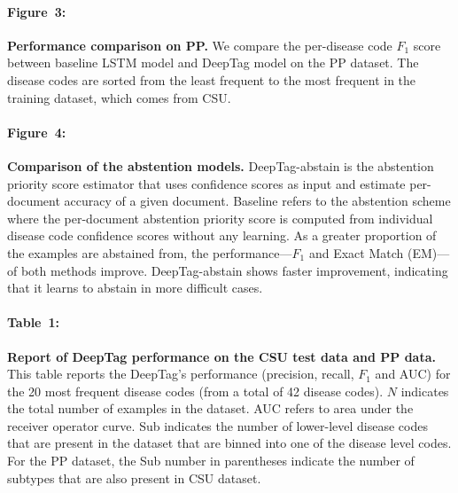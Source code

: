 \documentclass{article}[11pt,oneside]
\begin{document}
\paragraph{Figure~3:} {\bf Performance comparison on PP.} 
We compare the per-disease code $F_1$ score between baseline LSTM model and DeepTag model on the PP dataset. The disease codes are sorted from the least frequent to the most frequent in the training dataset, which comes from CSU.

\paragraph{Figure~4:} \textbf{Comparison of the abstention models. } DeepTag-abstain is the abstention priority score estimator that uses confidence scores as input and estimate per-document accuracy of a given document. Baseline refers to the abstention scheme where the per-document abstention priority score is computed from individual disease code confidence scores without any learning. As a greater proportion of the examples are abstained from, the performance---$F_1$ and Exact Match (EM)---of both methods improve. DeepTag-abstain shows faster improvement, indicating that it learns to abstain in more difficult cases.

\paragraph{Table~1:} \textbf{Report of DeepTag performance on the CSU test data and PP data.} This table reports the DeepTag's performance (precision, recall, $F_1$ and AUC) for the 20 most frequent disease codes (from a total of 42 disease codes). $N$ indicates the total number of examples in the dataset. AUC refers to area under the receiver operator curve. Sub indicates the number of lower-level disease codes that are present in the dataset that are binned into one of the disease level codes. For the PP dataset, the Sub number in parentheses indicate the number of subtypes that are also present in CSU dataset. 
\end{document}
